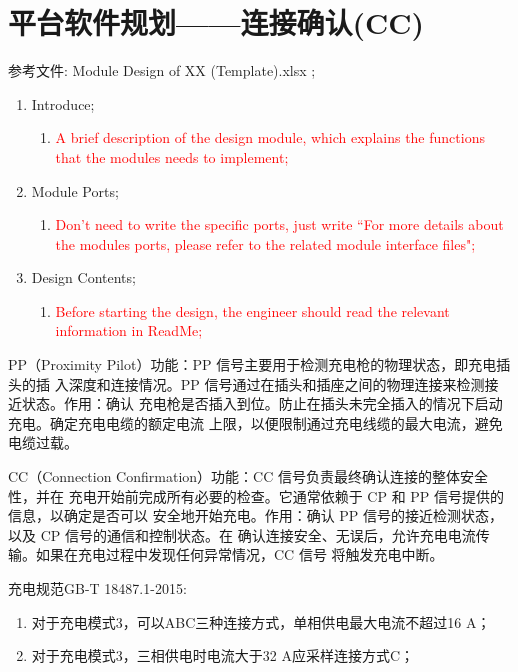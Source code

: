 
\chapter{平台软件规划——连接确认(CC)}

 参考文件: Module Design of XX (Template).xlsx \cite{MDOT1};   
  
 \begin{enumerate}[label=\textbullet]
	\item  Introduce;
        \begin{enumerate}[label={}]
            \item \textcolor{red}{A brief description of the design module, which explains the functions that the modules needs to implement;}
        \end{enumerate}
	\item  Module Ports;
        \begin{enumerate}[label={}]
            \item \textcolor{red}{Don't need to write the specific ports, just write ``For more details about the modules ports, please refer to the related module interface files";}
        \end{enumerate}
	\item  Design Contents;
        \begin{enumerate}[label={}]
            \item \textcolor{red}{Before starting the design, the engineer should read the relevant information in ReadMe;}
        \end{enumerate}
\end{enumerate}

PP（Proximity Pilot）功能\cite{SAE}：PP 信号主要用于检测充电枪的物理状态，即充电插头的插
入深度和连接情况。PP 信号通过在插头和插座之间的物理连接来检测接近状态。作用：确认
充电枪是否插入到位。防止在插头未完全插入的情况下启动充电。确定充电电缆的额定电流
上限，以便限制通过充电线缆的最大电流，避免电缆过载。

CC（Connection Confirmation）功能\cite{GB18487_1}：CC 信号负责最终确认连接的整体安全性，并在
充电开始前完成所有必要的检查。它通常依赖于 CP 和 PP 信号提供的信息，以确定是否可以
安全地开始充电。作用：确认 PP 信号的接近检测状态，以及 CP 信号的通信和控制状态。在
确认连接安全、无误后，允许充电电流传输。如果在充电过程中发现任何异常情况，CC 信号
将触发充电中断。

充电规范GB-T 18487.1-2015\cite{GB18487_1}:
    \begin{enumerate}
        \item 对于充电模式3，可以ABC三种连接方式，单相供电最大电流不超过16 A；
        \item 对于充电模式3，三相供电时电流大于32 A应采样连接方式C；
    \end{enumerate}

